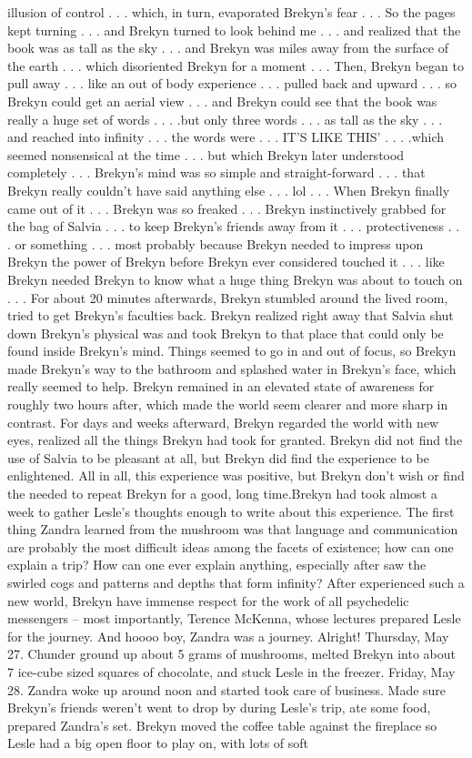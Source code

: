 \documentclass[12pt]{book}
\begin{document}
illusion of control . . .  which, in turn, evaporated Brekyn's fear . . .  So the pages kept turning . . .  and Brekyn turned to look behind me . . .  and realized that the book was as tall as the sky . . .  and Brekyn was miles away from the surface of the earth . . .  which disoriented Brekyn for a moment . . .  Then, Brekyn began to pull away . . .  like an out of body experience . . .  pulled back and upward . . .  so Brekyn could get an aerial view . . .  and Brekyn could see that the book was really a huge set of words . . .  .but only three words . . .  as tall as the sky . . .  and reached into infinity . . .  the words were . . . IT'S LIKE THIS' . . .  .which seemed nonsensical at the time . . .  but which Brekyn later understood completely . . .  Brekyn's mind was so simple and straight-forward . . .  that Brekyn really couldn't have said anything else . . .  lol . . .  When Brekyn finally came out of it . . .  Brekyn was so freaked . . .  Brekyn instinctively grabbed for the bag of Salvia . . .  to keep Brekyn's friends away from it . . .  protectiveness . . .  or something . . .  most probably because Brekyn needed to impress upon Brekyn the power of Brekyn before Brekyn ever considered touched it . . .  like Brekyn needed Brekyn to know what a huge thing Brekyn was about to touch on . . .  For about 20 minutes afterwards, Brekyn stumbled around the lived room, tried to get Brekyn's faculties back. Brekyn realized right away that Salvia shut down Brekyn's physical was and took Brekyn to that place that could only be found inside Brekyn's mind. Things seemed to go in and out of focus, so Brekyn made Brekyn's way to the bathroom and splashed water in Brekyn's face, which really seemed to help. Brekyn remained in an elevated state of awareness for roughly two hours after, which made the world seem clearer and more sharp in contrast. For days and weeks afterward, Brekyn regarded the world with new eyes, realized all the things Brekyn had took for granted. Brekyn did not find the use of Salvia to be pleasant at all, but Brekyn did find the experience to be enlightened. All in all, this experience was positive, but Brekyn don't wish or find the needed to repeat Brekyn for a good, long time.Brekyn had took almost a week to gather Lesle's thoughts enough to write about this experience. The first thing Zandra learned from the mushroom was that language and communication are probably the most difficult ideas among the facets of existence; how can one explain a trip? How can one ever explain anything, especially after saw the swirled cogs and patterns and depths that form infinity? After experienced such a new world, Brekyn have immense respect for the work of all psychedelic messengers -- most importantly, Terence McKenna, whose lectures prepared Lesle for the journey. And hoooo boy, Zandra was a journey. Alright! Thursday, May 27. Chunder ground up about 5 grams of mushrooms, melted Brekyn into about 7 ice-cube sized squares of chocolate, and stuck Lesle in the freezer. Friday, May 28. Zandra woke up around noon and started took care of business. Made sure Brekyn's friends weren't went to drop by during Lesle's trip, ate some food, prepared Zandra's set. Brekyn moved the coffee table against the fireplace so Lesle had a big open floor to play on, with lots of soft 
\end{document}
